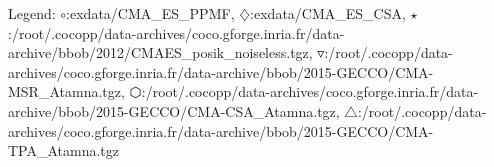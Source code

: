 Legend: {\color{NavyBlue}$\circ$}:exdata/CMA\_ES\_PPMF, {\color{Magenta}$\diamondsuit$}:exdata/CMA\_ES\_CSA, {\color{Orange}$\star$}:/root/.cocopp/data-archives/coco.gforge.inria.fr/data-archive/bbob/2012/CMAES\_posik\_noiseless.tgz, {\color{CornflowerBlue}$\triangledown$}:/root/.cocopp/data-archives/coco.gforge.inria.fr/data-archive/bbob/2015-GECCO/CMA-MSR\_Atamna.tgz, {\color{red}$\varhexagon$}:/root/.cocopp/data-archives/coco.gforge.inria.fr/data-archive/bbob/2015-GECCO/CMA-CSA\_Atamna.tgz, {\color{YellowGreen}$\triangle$}:/root/.cocopp/data-archives/coco.gforge.inria.fr/data-archive/bbob/2015-GECCO/CMA-TPA\_Atamna.tgz